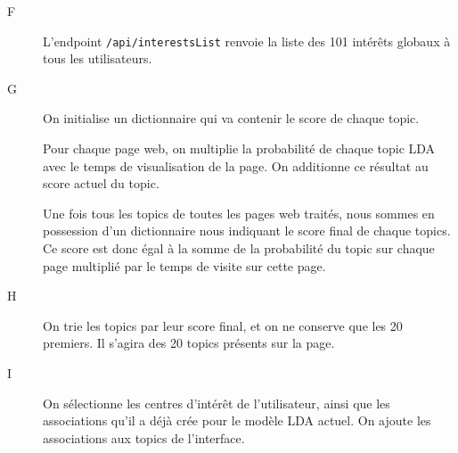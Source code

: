 \begin{description}
			\item[F] L'endpoint \texttt{/api/interestsList} renvoie la liste des 101 intérêts globaux à tous les utilisateurs.

			\item[G] On initialise un dictionnaire qui va contenir le score de chaque topic.
			
			Pour chaque page web, on multiplie la probabilité de chaque topic LDA avec le temps de visualisation de la page. On additionne ce résultat au score actuel du topic.
			
			Une fois tous les topics de toutes les pages web traités, nous sommes en possession d'un dictionnaire nous indiquant le score final de chaque topics. Ce score est donc égal à la somme de la probabilité du topic sur chaque page multiplié par le temps de visite sur cette page.
			
			\item[H] On trie les topics par leur score final, et on ne conserve que les 20 premiers. Il s'agira des 20 topics présents sur la page.

			\item[I] On sélectionne les centres d'intérêt de l'utilisateur, ainsi que les associations qu'il a déjà crée pour le modèle LDA actuel. On ajoute les associations aux topics de l'interface.
		\end{description}

